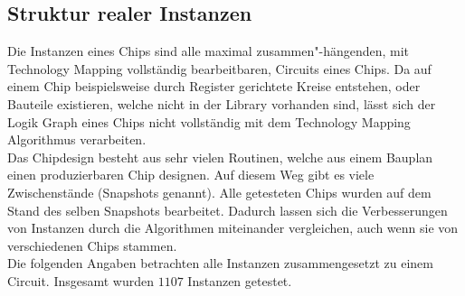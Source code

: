 \documentclass[11pt, a4paper, german]{article}
\newcommand{\TM}{Technology  Mapping }
\begin{document}
 \subsection{Struktur realer Instanzen}
\label{subsec:struktur_realer_instanzen} 
Die Instanzen eines Chips sind alle maximal zusammen"-h\"angen\-den, mit \TM vollständig bearbeitbaren, Circuits eines Chips. Da auf einem Chip beispielsweise durch Register gerichtete Kreise entstehen, oder Bauteile existieren, welche nicht in der Library vorhanden sind, lässt sich der Logik Graph eines Chips nicht vollständig mit dem \TM Algorithmus verarbeiten. \\
 Das Chipdesign besteht aus sehr vielen Routinen, welche aus einem Bauplan einen produzierbaren Chip designen. Auf diesem Weg gibt es viele Zwischenstände (Snapshots genannt). Alle getesteten Chips wurden auf dem Stand  des selben Snapshots bearbeitet. Dadurch lassen sich die Verbesserungen von Instanzen durch die Algorithmen miteinander vergleichen, auch wenn sie von verschiedenen Chips stammen.\\
 Die folgenden Angaben betrachten alle Instanzen zusammengesetzt zu einem Circuit.
 Insgesamt wurden $1107$ Instanzen getestet. \\
\end{document}
